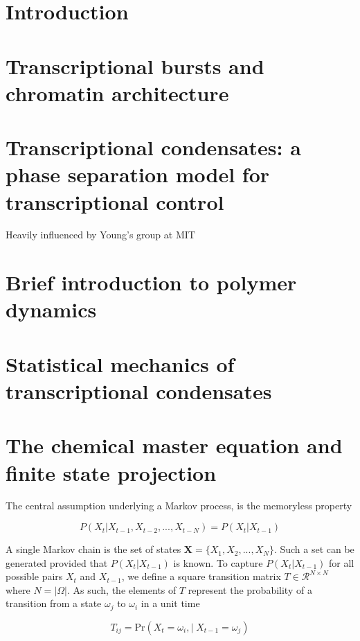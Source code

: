 \documentclass{ucetd}
\begin{document}
\section{Introduction}

\section{Transcriptional bursts and chromatin architecture}

\section{Transcriptional condensates: a phase separation model for transcriptional control}

Heavily influenced by Young's group at MIT


\section{Brief introduction to polymer dynamics}

\section{Statistical mechanics of transcriptional condensates}

\section{The chemical master equation and finite state projection}

The central assumption underlying a Markov process, is the memoryless property

\begin{equation*}
P(X_{t}|X_{t-1}, X_{t-2}, ..., X_{t-N}) = P(X_{t}|X_{t-1})
\end{equation*}

A single Markov chain is the set of states $\bm{X} = \{X_{1},X_{2},...,X_{N}\}$. Such a set can be generated provided that $P(X_{t}|X_{t-1})$ is known. To capture $P(X_{t}|X_{t-1})$ for all possible pairs $X_{t}$ and $X_{t-1}$, we define a square transition matrix $T\in \mathcal{R}^{N\times N}$ where $N = |\Omega|$. As such, the elements of $T$ represent the probability of a transition from a state $\omega_{j}$ to $\omega_{i}$ in a unit time

\begin{equation*}
T_{ij} = \mathrm{Pr}\left(X_{t}=\omega_{i}, | \;X_{t-1}=\omega_{j}\right)
\end{equation*}
\end{document}

